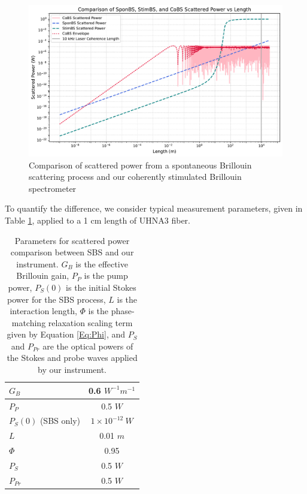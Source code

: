 \documentclass[%
  reprint,
  superscriptaddress,
  amsmath,amssymb,
  aps,
  prapplied,
]{revtex4-2}
\begin{document}
\begin{figure}[t]
\centering
\includegraphics[width=.95\textwidth]{SponBSvsStimBSvsCoBS.pdf}
\caption{Comparison of scattered power from a spontaneous Brillouin scattering process and our coherently stimulated Brillouin spectrometer}
\label{fig:SponBSvsStimBSvsCoBS}
\end{figure}

To quantify the difference, we consider typical measurement parameters, given in Table \ref{tab:SBS Comparison Parameters}, applied to a 1 cm length of UHNA3 fiber.

\begin{table}[h]
  \centering
  \renewcommand{\arraystretch}{1.2}
  \begin{tabular}{|l|c|}
    \hline
    $G_{B}$ & 0.6 $W^{-1} m^{-1}$ \\
    \hline
    $P_{P}$ & 0.5 $W$ \\
    \hline
    $P_{S}(0)$ (SBS only) & $1 \times 10^{-12} \ W$ \\
    \hline
    $L$ & 0.01 $m$ \\
    \hline
    $\Phi$ & 0.95 \\
    \hline
    $P_{S}$ & 0.5 $W$ \\
    \hline
    $P_{Pr}$ & 0.5 $W$ \\
    \hline
  \end{tabular}
  \caption{Parameters for scattered power comparison between SBS and our instrument. $G_{B}$ is the effective Brillouin gain, $P_{P}$ is the pump power, $P_{S}(0)$ is the initial Stokes power for the SBS process, $L$ is the interaction length, $\Phi$ is the phase-matching relaxation scaling term given by Equation \ref{Eq:Phi}, and $P_{S}$ and $P_{Pr}$ are the optical powers of the Stokes and probe waves applied by our instrument.}
  \label{tab:SBS Comparison Parameters}
\end{table}
\end{document}
